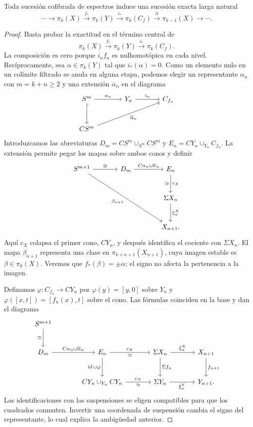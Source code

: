 \begin{prop}\label{prop:c17-exactitud-cofibra}
Toda sucesión cofibrada de espectros induce una sucesión exacta larga natural
\[
\cdots\longrightarrow\pi_k(X)\xrightarrow{f_*}\pi_k(Y)
\xrightarrow{i_*}\pi_k(C_f)\xrightarrow{\partial}\pi_{k-1}(X)
\longrightarrow\cdots.
\]
\end{prop}

\begin{proof}
Basta probar la exactitud en el término central de
\[
\pi_k(X)\xrightarrow{f_*}\pi_k(Y)\xrightarrow{i_*}\pi_k(C_f).
\]
La composición es cero porque $i_nf_n$ es nulhomotópica en cada nivel. Recíprocamente, sea $\alpha\in\pi_k(Y)$ tal que $i_*(\alpha)=0$. Como un elemento nulo en un colímite filtrado se anula en alguna etapa, podemos elegir un representante $\alpha_n$ con $m=k+n\ge2$ y una extensión $\overline\alpha_n$ en el diagrama
\[
\begin{tikzcd}[column sep=large,row sep=large]
S^m\arrow[r,"\alpha_n"]\arrow[d,hook]&Y_n\arrow[r,"i_n"]&C_{f_n}\\
CS^m\arrow[urr,"\overline\alpha_n"']&&
\end{tikzcd}
\]
Introduzcamos las abreviaturas $D_m=CS^m\cup_{S^m}CS^m$ y $E_n=CY_n\cup_{Y_n}C_{f_n}$. La extensión permite pegar los mapas sobre ambos conos y definir
\[
\begin{tikzcd}[column sep=large,row sep=large]
S^{m+1}\arrow[r,"\cong"]\arrow[rrdd,"\beta_{n+1}"']
&D_m\arrow[r,"C\alpha_n\cup\overline\alpha_n"]&E_n\arrow[d,"c_X","\simeq"']\\
&&\Sigma X_n\arrow[d,"\xi_n^X"]\\
&&X_{n+1}.
\end{tikzcd}
\]
Aquí $c_X$ colapsa el primer cono, $CY_n$, y después identifica el cociente con $\Sigma X_n$. El mapa $\beta_{n+1}$ representa una clase en $\pi_{k+n+1}(X_{n+1})$, cuya imagen estable es $\beta\in\pi_k(X)$. Veremos que $f_*(\beta)=\pm\alpha$; el signo no afecta la pertenencia a la imagen.

Definamos $\varphi\colon C_{f_n}\to CY_n$ por $\varphi(y)=[y,0]$ sobre $Y_n$ y $\varphi([x,t])=[f_n(x),t]$ sobre el cono. Las fórmulas coinciden en la base y dan el diagrama
\[
\begin{tikzcd}[column sep=large,row sep=large]
S^{m+1}\arrow[d,"\cong"']&&&\\
D_m\arrow[r,"C\alpha_n\cup\overline\alpha_n"]
&E_n\arrow[r,"c_X","\simeq"']\arrow[d,"\id\cup\varphi"']
&\Sigma X_n\arrow[r,"\xi_n^X"]\arrow[d,"\Sigma f_n"]
&X_{n+1}\arrow[d,"f_{n+1}"]\\
&CY_n\cup_{Y_n}CY_n\arrow[r,"c_N","\simeq"']
&\Sigma Y_n\arrow[r,"\xi_n^Y"']&Y_{n+1}.
\end{tikzcd}
\]
Las identificaciones con las suspensiones se eligen compatibles para que los cuadrados conmuten. Invertir una coordenada de suspensión cambia el signo del representante, lo cual explica la ambigüedad anterior.


\end{proof}
